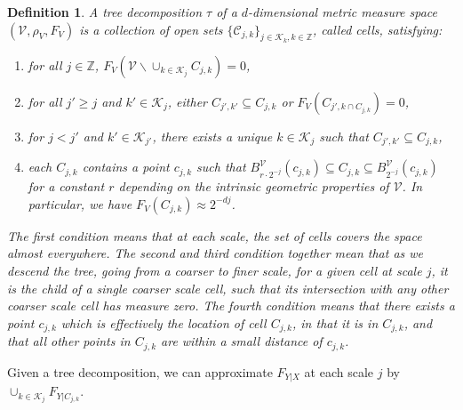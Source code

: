 \documentclass{article} %
\providecommand{\mc}[1]{\mathcal{#1}}
\newcommand{\from}{{\ensuremath{\colon}}}  %
\newcommand{\ZZ}{\mathbb{Z}}
\newtheorem{definition}[theorem]{Definition}
\begin{document}
\begin{definition}\label{Def:tree} A \emph{tree decomposition} $\tau$ of a $d$-dimensional metric measure space $(\mc{V}, \rho_V, F_V)$ is a collection of open sets $\{\mc{C}_{j,k}\}_{j \in \mathcal{K}_k,k \in \ZZ}$, called \emph{cells}, satisfying:
\begin{enumerate}\itemsep0pt
	\item for all $j \in \ZZ$, $F_V(\mc{V} \backslash \cup_{k \in \mc{K}_j} C_{j,k} )=0$,
	\item for all $j' \geq j$ and $k' \in \mc{K}_j$, either $C_{j',k'} \subseteq C_{j,k}$ or $F_V(C_{j',k \cap C_{j,k}})=0$,
	\item for $j < j'$ and $k' \in \mc{K}_{j'}$, there exists a unique $k \in \mc{K}_j$ such that $C_{j',k'} \subseteq C_{j,k}$,
	\item each $C_{j,k}$ contains a point $c_{j,k}$ such that $B_{r \cdot 2^{-j}}^{\mc{V}}(c_{j,k}) \subseteq C_{j,k} \subseteq B_{2^{-j}}^{\mc{V}}(c_{j,k})$ for a constant $r$ depending on the intrinsic geometric properties of $\mc{V}$.  In particular, we have $F_V(C_{j,k}) \approx 2^{-dj}$.
\end{enumerate}
The first condition means that at each scale, the set of cells covers the space almost everywhere. The second and third condition together mean that as we descend the tree, going from a coarser to finer scale, for a given cell at scale $j$, it is the child of a single coarser scale cell, such that its intersection with any other coarser scale cell has measure zero. The fourth condition means that there exists a point $c_{j,k}$ which is effectively the location of cell $C_{j,k}$, in that it is in $C_{j,k}$, and that all other points in $C_{j,k}$ are within a small distance of $c_{j,k}$.  
% 
% 
\end{definition}

Given a tree decomposition, we can approximate $F_{Y|X}$ at each scale $j$ by $\cup_{k \in \mc{K}_j} F_{Y|C_{j,k}}$.  


\paragraph{}

\end{document}
